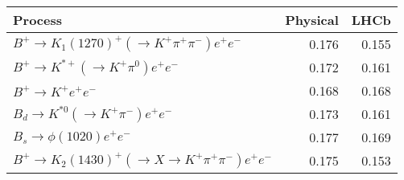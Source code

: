\begin{tabular}{lrr}
\toprule
Process & Physical & LHCb \\
\midrule
$B^+\to K_1(1270)^+(\to K^+\pi^+\pi^-)e^+e^-$ & 0.176 & 0.155 \\
$B^+\to K^{*+}(\to K^+\pi^0)e^+e^-$ & 0.172 & 0.161 \\
$B^+\to K^+e^+e^-$ & 0.168 & 0.168 \\
$B_d\to K^{*0}(\to K^+\pi^-)e^+e^-$ & 0.173 & 0.161 \\
$B_s\to \phi(1020)e^+e^-$ & 0.177 & 0.169 \\
$B^+\to K_2(1430)^+(\to X \to K^+\pi^+\pi^-)e^+e^-$ & 0.175 & 0.153 \\
\bottomrule
\end{tabular}

